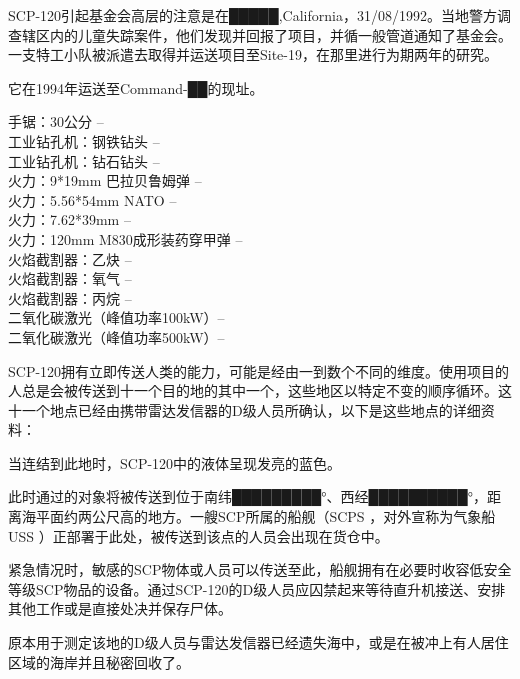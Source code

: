 SCP-120引起基金会高层的注意是在█████,California，31\slash 08\slash 1992。当地警方调查辖区内的儿童失踪案件，他们发现并回报了项目，并循一般管道通知了基金会。一支特工小队被派遣去取得并运送项目至Site-19，在那里进行为期两年的研究。

它在1994年运送至Command-██的现址。



\begin{scpbox}

手锯：30公分 – \\
工业钻孔机：钢铁钻头 – \\
工业钻孔机：钻石钻头 – \\
火力：9*19mm 巴拉贝鲁姆弹 – \\
火力：5.56*54mm NATO – \\
火力：7.62*39mm – \\
火力：120mm M830成形装药穿甲弹 – \\
火焰截割器：乙炔 – \\
火焰截割器：氧气 – \\
火焰截割器：丙烷 – \\
二氧化碳激光（峰值功率100kW）– \\
二氧化碳激光（峰值功率500kW）– 

\end{scpbox}


SCP-120拥有立即传送人类的能力，可能是经由一到数个不同的维度。使用项目的人总是会被传送到十一个目的地的其中一个，这些地区以特定不变的顺序循环。这十一个地点已经由携带雷达发信器的D级人员所确认，以下是这些地点的详细资料：

当连结到此地时，SCP-120中的液体呈现发亮的蓝色。

此时通过的对象将被传送到位于南纬█████████°、西经██████████°，距离海平面约两公尺高的地方。一艘SCP所属的船舰（SCPS ，对外宣称为气象船USS ）正部署于此处，被传送到该点的人员会出现在货仓中。

紧急情况时，敏感的SCP物体或人员可以传送至此，船舰拥有在必要时收容低安全等级SCP物品的设备。通过SCP-120的D级人员应囚禁起来等待直升机接送、安排其他工作或是直接处决并保存尸体。

原本用于测定该地的D级人员与雷达发信器已经遗失海中，或是在被冲上有人居住区域的海岸并且秘密回收了。

